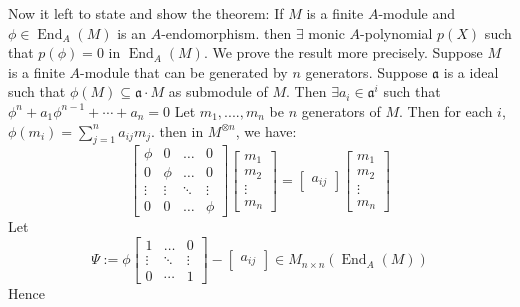\documentclass[12pt]{article}
\theoremstyle{definition}
\theoremstyle{plain}
\DeclareMathOperator{\End}{End}
\begin{document}
 \medskip
 Now it left to state and show the theorem:
  If $M$ is a finite $A$-module and $\phi\in \End_A(M)$ is an $A$-endomorphism. then $\exists$ monic $A$-polynomial $p(X)$ such that $p(\phi)=0$ in $\End_A(M)$.
 \proof We prove the result more precisely. Suppose $M$ is a finite $A$-module that can be generated by $n$ generators. Suppose $\mathfrak{a}$ is a ideal such that $\phi(M)\subseteq \mathfrak{a}\cdot M$ as submodule of $M$. Then $\exists a_i\in \mathfrak{a}^i$ such that $\phi^n+a_1\phi^{n-1}+\cdots +a_n=0$
\proof Let $m_1, ...., m_n$ be $n$ generators of $M$. Then for each $i$, $\phi(m_i)=\sum_{j=1}^na_{ij}m_j$. then in $M^{\otimes n}$, we have:
\begin{equation*}
      \begin{bmatrix}
      \phi & 0 &\ldots & 0 \\
      0 & \phi &\ldots & 0 \\
      \vdots &\vdots &\ddots & \vdots \\
      0 & 0 &\ldots &\phi
     \end{bmatrix}
     \begin{bmatrix}
       m_1\\
       m_2\\
       \vdots\\
       m_n
     \end{bmatrix}
    =\begin{bmatrix}
        a_{ij}
     \end{bmatrix}
     \begin{bmatrix}
       m_1\\
       m_2\\
       \vdots\\
       m_n
     \end{bmatrix}
\end{equation*}
Let
\begin{equation*}
  \Psi:=\phi\begin{bmatrix}
    1 &\ldots &0\\
    \vdots &\ddots & \vdots\\
    0 &\cdots &1
  \end{bmatrix}-\begin{bmatrix}
        a_{ij}
     \end{bmatrix}\in M_{n\times n}(\End_A(M))
\end{equation*}
Hence
\end{document}
